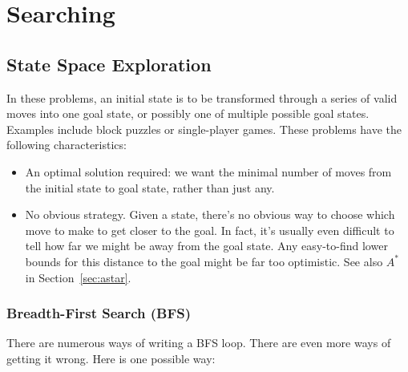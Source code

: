 \chapter{Searching}
\def\astar{$A^*$}

 

\section{State Space Exploration}

In these problems, an initial state is to be transformed through a series of valid
moves into one goal state, or possibly one of multiple possible goal states. 
Examples include block puzzles or single-player games.
These problems have the following characteristics:
\begin{itemize}
\item An optimal solution required: we want the minimal number of moves from the
initial state to goal state, rather than just any.

\item No obvious strategy.  Given a state, there's no obvious way to choose which
move to make to get closer to the goal.  In fact, it's usually even difficult to
tell how far we might be away from the goal state.  Any easy-to-find lower bounds
for this distance to the goal might be far too optimistic.  
See also \astar{} in Section~\ref{sec:astar}.

\end{itemize}

\subsection{Breadth-First Search (BFS)}
\label{sec:bfs}
There are numerous ways of writing a BFS loop.  There are even more ways of
getting it wrong.
Here is one possible way:

\inputminted[fontsize=\footnotesize,linenos=true]{java}{code/bfsloop.java}

